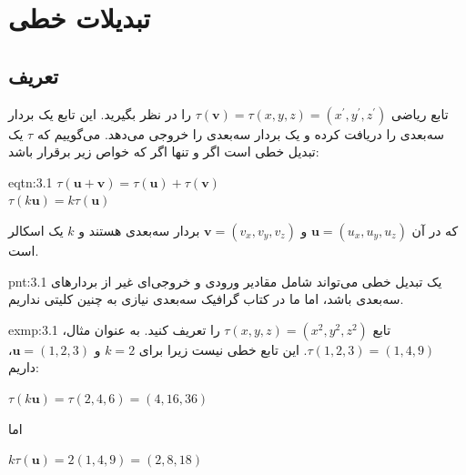 \setcounter{figure}{0}
\renewcommand{\thefigure}{\arabic{figure}.\arabic{chapter}}


\section{\textbf{تبدیلات خطی}}
\label{sec:3.1}

\subsection{\textbf{تعریف}}
\label{subsec:3.1.1}
{
    \Large
    \begin{spacing}{1.5}
        تابع ریاضی $\tau(\textbf{v})=\tau(x,y,z)=(x^\prime,y^\prime,z^\prime)$ را در نظر بگیرید.
        این تابع یک بردار سه‌بعدی را دریافت کرده و یک بردار سه‌بعدی را خروجی می‌دهد.
        می‌گوییم که $\tau$ یک تبدیل خطی است اگر و تنها اگر که خواص زیر برقرار باشد:

        \begin{eqtn}{eqtn:3.1}
            \centering
            $\tau(\textbf{u}+\textbf{v})=\tau(\textbf{u})+\tau(\textbf{v})$\\
            $\tau(k\textbf{u})=k\tau(\textbf{u})$
        \end{eqtn}

        که در آن $\textbf{u}=(u_x,u_y,u_z)$ و $\textbf{v}=(v_x,v_y,v_z)$ بردار سه‌بعدی هستند و $k$ یک اسکالر است.

        \begin{point}{pnt:3.1}
            یک تبدیل خطی می‌تواند شامل مقادیر ورودی و خروجی‌ای غیر از بردارهای سه‌بعدی باشد،
            اما ما در کتاب گرافیک سه‌بعدی نیازی به چنین کلیتی نداریم.
        \end{point}

        \begin{exmp}{exmp:3.1}
            \Large
            تابع $\tau(x,y,z)=(x^2,y^2,z^2)$ را تعریف کنید.
            به عنوان مثال، $\tau(1,2,3)=(1,4,9)$. این تابع خطی نیست زیرا برای $k=2$ و $\textbf{u}=(1,2,3)$، داریم:

            \begin{center}
                $\tau(k\textbf{u})=\tau(2,4,6)=(4,16,36)$
            \end{center}

            اما

            \begin{center}
                $k\tau(\textbf{u})=2(1,4,9)=(2,8,18)$
            \end{center}


\end{exmp}
\end{spacing}}
